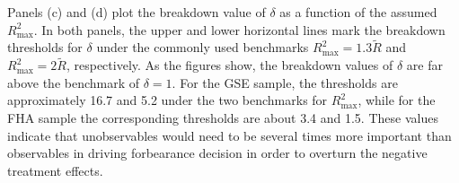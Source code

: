 \documentclass[11pt]{article}
\begin{document}
{ Panels (c) and (d) plot the breakdown value of \( \delta \) as a function of the assumed \( R^2_{\text{max}} \). In both panels, the upper and lower horizontal lines mark the breakdown thresholds for \( \delta \) under the commonly used benchmarks \( R^2_{\text{max}} = 1.3\tilde{R} \) and \( R^2_{\text{max}} = 2\tilde{R} \), respectively. As the figures show, the breakdown values of \( \delta \) are far above the benchmark of \( \delta = 1 \). For the GSE sample, the thresholds are approximately 16.7 and 5.2 under the two benchmarks for \( R^2_{\text{max}} \), while for the FHA sample the corresponding thresholds are about 3.4 and 1.5. These values indicate that unobservables would need to be several times more important than observables in driving forbearance decision in order to overturn the negative treatment effects.


 

\begin{comment}

\subsubsection{Diegert, Masten, and Poirier (2022): Sensitivity Bounds Without Orthogonality Assumptions}
\citet{diegert2022assessing} address a central assumption in \citet{oster2019}: omitted variables are uncorrelated with the included controls. They also formally show that her residualization method is misleading if unobservables are not orthogonal to observables. The paper overcomes these shortcomings by introducing a new framework that defines sharp bounds on the treatment effect using three interpretable scalar sensitivity parameters:

\begin{enumerate}
  \item \textbf{\( \bar{r}_X \)}: The maximum partial \( R^2 \) that unobservables can have with the treatment variable, after conditioning on observed covariates.
  
  \item \textbf{\( \bar{r}_Y \)}: The maximum partial \( R^2 \) that unobservables can have with the outcome variable, again conditional on observed covariates. This parameter is usually assumed to be infinity, which means allowing the unobservables to explain all the remaining variance in the outcome not explained by the observed covariates.
  
  \item \textbf{\( \bar{c} \)}: The maximum allowable partial correlation between the residuals of the treatment and outcome equations (after controlling for observables). This captures the remaining endogeneity attributable to unobserved confounding.
\end{enumerate}


\end{comment}}
\end{document}
